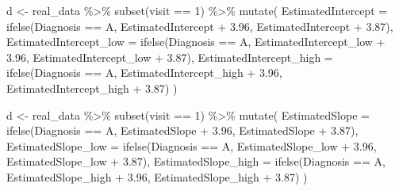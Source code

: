 \documentclass[
]{article}
\newenvironment{Shaded}{\begin{snugshade}}{\end{snugshade}}
\newcommand{\AttributeTok}[1]{\textcolor[rgb]{0.77,0.63,0.00}{#1}}
\newcommand{\DecValTok}[1]{\textcolor[rgb]{0.00,0.00,0.81}{#1}}
\newcommand{\FloatTok}[1]{\textcolor[rgb]{0.00,0.00,0.81}{#1}}
\newcommand{\FunctionTok}[1]{\textcolor[rgb]{0.00,0.00,0.00}{#1}}
\newcommand{\NormalTok}[1]{#1}
\newcommand{\OtherTok}[1]{\textcolor[rgb]{0.56,0.35,0.01}{#1}}
\newcommand{\SpecialCharTok}[1]{\textcolor[rgb]{0.00,0.00,0.00}{#1}}
\newcommand{\StringTok}[1]{\textcolor[rgb]{0.31,0.60,0.02}{#1}}
\begin{document}
\begin{Shaded}
\begin{Highlighting}[]
\NormalTok{d }\OtherTok{\textless{}{-}}\NormalTok{ real\_data }\SpecialCharTok{\%\textgreater{}\%} \FunctionTok{subset}\NormalTok{(visit }\SpecialCharTok{==} \DecValTok{1}\NormalTok{) }\SpecialCharTok{\%\textgreater{}\%} 
  \FunctionTok{mutate}\NormalTok{(}
    \AttributeTok{EstimatedIntercept =} \FunctionTok{ifelse}\NormalTok{(Diagnosis }\SpecialCharTok{==} \StringTok{\textquotesingle{}A\textquotesingle{}}\NormalTok{,}
\NormalTok{                                    EstimatedIntercept }\SpecialCharTok{+} \FloatTok{3.96}\NormalTok{,}
\NormalTok{                                    EstimatedIntercept }\SpecialCharTok{+} \FloatTok{3.87}\NormalTok{),}
    \AttributeTok{EstimatedIntercept\_low =} \FunctionTok{ifelse}\NormalTok{(Diagnosis }\SpecialCharTok{==} \StringTok{\textquotesingle{}A\textquotesingle{}}\NormalTok{,}
\NormalTok{                                   EstimatedIntercept\_low }\SpecialCharTok{+} \FloatTok{3.96}\NormalTok{,}
\NormalTok{                                   EstimatedIntercept\_low }\SpecialCharTok{+} \FloatTok{3.87}\NormalTok{),}
    \AttributeTok{EstimatedIntercept\_high =} \FunctionTok{ifelse}\NormalTok{(Diagnosis }\SpecialCharTok{==} \StringTok{\textquotesingle{}A\textquotesingle{}}\NormalTok{,}
\NormalTok{                                     EstimatedIntercept\_high }\SpecialCharTok{+} \FloatTok{3.96}\NormalTok{,}
\NormalTok{                                     EstimatedIntercept\_high }\SpecialCharTok{+} \FloatTok{3.87}\NormalTok{)}
\NormalTok{)}


\NormalTok{d }\OtherTok{\textless{}{-}}\NormalTok{ real\_data }\SpecialCharTok{\%\textgreater{}\%} \FunctionTok{subset}\NormalTok{(visit }\SpecialCharTok{==} \DecValTok{1}\NormalTok{) }\SpecialCharTok{\%\textgreater{}\%} 
  \FunctionTok{mutate}\NormalTok{(}
    \AttributeTok{EstimatedSlope =} \FunctionTok{ifelse}\NormalTok{(Diagnosis }\SpecialCharTok{==} \StringTok{\textquotesingle{}A\textquotesingle{}}\NormalTok{,}
\NormalTok{                                    EstimatedSlope }\SpecialCharTok{+} \FloatTok{3.96}\NormalTok{,}
\NormalTok{                                    EstimatedSlope }\SpecialCharTok{+} \FloatTok{3.87}\NormalTok{),}
    \AttributeTok{EstimatedSlope\_low =} \FunctionTok{ifelse}\NormalTok{(Diagnosis }\SpecialCharTok{==} \StringTok{\textquotesingle{}A\textquotesingle{}}\NormalTok{,}
\NormalTok{                                   EstimatedSlope\_low }\SpecialCharTok{+} \FloatTok{3.96}\NormalTok{,}
\NormalTok{                                   EstimatedSlope\_low }\SpecialCharTok{+} \FloatTok{3.87}\NormalTok{),}
    \AttributeTok{EstimatedSlope\_high =} \FunctionTok{ifelse}\NormalTok{(Diagnosis }\SpecialCharTok{==} \StringTok{\textquotesingle{}A\textquotesingle{}}\NormalTok{,}
\NormalTok{                                     EstimatedSlope\_high }\SpecialCharTok{+} \FloatTok{3.96}\NormalTok{,}
\NormalTok{                                     EstimatedSlope\_high }\SpecialCharTok{+} \FloatTok{3.87}\NormalTok{)}
\NormalTok{)}
    

\end{Highlighting}
\end{Shaded}
\end{document}
